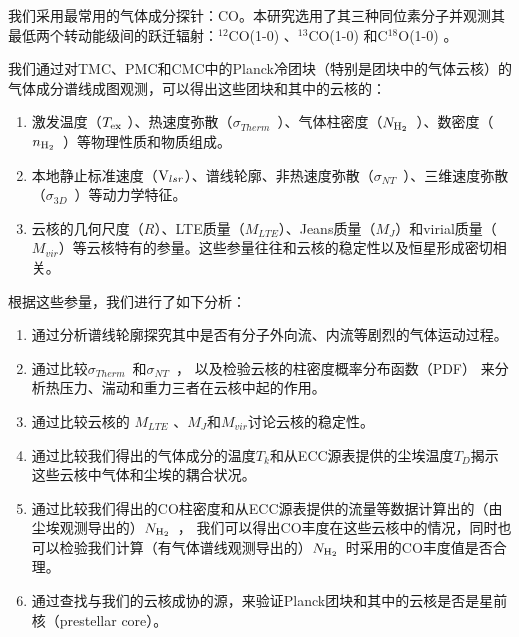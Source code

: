 \documentclass[UTF8, nocolorlinks]{pkuthss}
\newcommand{\coaa}{$^{12}$CO(1-0) }
\newcommand{\cobb}{$^{13}$CO(1-0) }
\newcommand{\cocc}{C$^{18}$O(1-0) }
\newcommand{\vlsr}{${\rm V } _{lsr}$}
\newcommand{\texc}{$T_{\rm {ex}}$ }
\newcommand{\nhyd}{$N_{\rm H_2}$\ }
\newcommand{\nnhyd}{$n_{\rm H_2}$\ }
\newcommand{\sigmath}{$\sigma _{Therm}$\ }
\newcommand{\sigmant}{$\sigma _{NT}$\ }
\newcommand{\sigmatd}{$\sigma _{3D}$\ }
\begin{document}
		我们采用最常用的气体成分探针：CO。本研究选用了其三种同位素分子并观测其最低两个转动能级间的跃迁辐射：\coaa 、\cobb  和\cocc 。

		我们通过对TMC、PMC和CMC中的Planck冷团块（特别是团块中的气体云核）的气体成分谱线成图观测，可以得出这些团块和其中的云核的：

		\begin{adjustwidth}{0.5cm}{0cm}
		\begin{enumerate}
			\item 激发温度（\texc ）、热速度弥散（\sigmath ）、气体柱密度（\nhyd ）、数密度（\nnhyd ）等物理性质和物质组成。

			\item 本地静止标准速度（\vlsr ）、谱线轮廓、非热速度弥散（\sigmant ）、三维速度弥散（\sigmatd ）等动力学特征。

			\item 云核的几何尺度（$R$）、LTE质量（$M_{LTE}$）、Jeans质量（$M_{J}$）和virial质量（$M_{vir}$）等云核特有的参量。这些参量往往和云核的稳定性以及恒星形成密切相关。
		\end{enumerate}
		\end{adjustwidth}
		
		根据这些参量，我们进行了如下分析：

		\begin{adjustwidth}{0.5cm}{0cm}
		\begin{enumerate}
			\item 通过分析谱线轮廓探究其中是否有分子外向流、内流等剧烈的气体运动过程。

			\item 通过比较\sigmath 和\sigmant ， 以及检验云核的柱密度概率分布函数（PDF） 来分析热压力、湍动和重力三者在云核中起的作用。

			\item 通过比较云核的 $M_{LTE}$ 、$M_{J}$和$M_{vir}$讨论云核的稳定性。

			\item 通过比较我们得出的气体成分的温度$T_k$和从ECC源表提供的尘埃温度$T_D$揭示这些云核中气体和尘埃的耦合状况。

			\item 通过比较我们得出的CO柱密度和从ECC源表提供的流量等数据计算出的（由尘埃观测导出的）\nhyd， 我们可以得出CO丰度在这些云核中的情况，同时也可以检验我们计算（有气体谱线观测导出的）\nhyd 时采用的CO丰度值是否合理。

			\item 通过查找与我们的云核成协的源，来验证Planck团块和其中的云核是否是星前核（prestellar core）。
		\end{enumerate}
		\end{adjustwidth}
\end{document}
